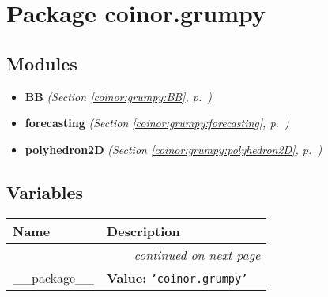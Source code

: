 %
%
%


\section{Package coinor.grumpy}

    \label{coinor:grumpy}


\subsection{Modules}

\begin{itemize}
\setlength{\parskip}{0ex}
\item \textbf{BB}
  \textit{(Section \ref{coinor:grumpy:BB}, p.~\pageref{coinor:grumpy:BB})}

\item \textbf{forecasting}
  \textit{(Section \ref{coinor:grumpy:forecasting}, p.~\pageref{coinor:grumpy:forecasting})}

\item \textbf{polyhedron2D}
  \textit{(Section \ref{coinor:grumpy:polyhedron2D}, p.~\pageref{coinor:grumpy:polyhedron2D})}

\end{itemize}



  \subsection{Variables}

    \vspace{-1cm}
\hspace{\varindent}\begin{longtable}{|p{\varnamewidth}|p{\vardescrwidth}|l}
\cline{1-2}
\cline{1-2} \centering \textbf{Name} & \centering \textbf{Description}& \\
\cline{1-2}
\endhead\cline{1-2}\multicolumn{3}{r}{\small\textit{continued on next page}}\\\endfoot\cline{1-2}
\endlastfoot\raggedright \_\-\_\-p\-a\-c\-k\-a\-g\-e\-\_\-\_\- & \raggedright \textbf{Value:} 
{\tt \texttt{'}\texttt{coinor.grumpy}\texttt{'}}&\\
\cline{1-2}
\end{longtable}

